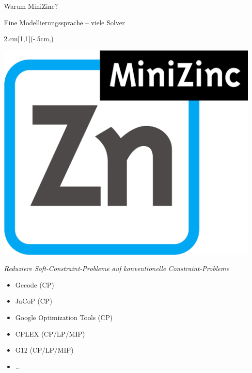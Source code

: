 \begin{frame}{Warum MiniZinc?}
\begin{parchment}[Rationale]
\centering 
\alert{Eine Modellierungssprache -- viele Solver} 
\end{parchment}

\begin{textblock*}{2.cm}[1,1](\textwidth-.5cm,\textheight-1.03cm)

\includegraphics[width=\textwidth]{img/MiniZn_logo.jpg} 

\end{textblock*}
\emph{Reduziere Soft-Constraint-Probleme auf konventionelle Constraint-Probleme}

\begin{itemize}
\item Gecode (CP)
\item JaCoP (CP)
\item Google Optimization Tools (CP)
\item CPLEX (CP/LP/MIP)
\item G12 (CP/LP/MIP)
\item \ldots
\end{itemize}
\end{frame}

